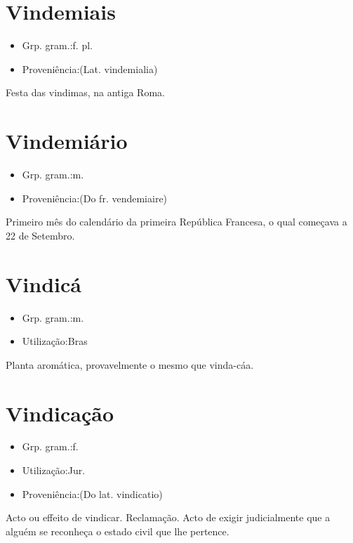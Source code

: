 \documentclass{article}
\begin{document}
\section{Vindemiais}
\begin{itemize}
\item {Grp. gram.:f. pl.}
\end{itemize}
\begin{itemize}
\item {Proveniência:(Lat. \textunderscore vindemialia\textunderscore )}
\end{itemize}
Festa das vindimas, na antiga Roma.
\section{Vindemiário}
\begin{itemize}
\item {Grp. gram.:m.}
\end{itemize}
\begin{itemize}
\item {Proveniência:(Do fr. \textunderscore vendemiaire\textunderscore )}
\end{itemize}
Primeiro mês do calendário da primeira República Francesa, o qual começava a 22 de Setembro.
\section{Vindicá}
\begin{itemize}
\item {Grp. gram.:m.}
\end{itemize}
\begin{itemize}
\item {Utilização:Bras}
\end{itemize}
Planta aromática, provavelmente o mesmo que \textunderscore vinda-cáa\textunderscore .
\section{Vindicação}
\begin{itemize}
\item {Grp. gram.:f.}
\end{itemize}
\begin{itemize}
\item {Utilização:Jur.}
\end{itemize}
\begin{itemize}
\item {Proveniência:(Do lat. \textunderscore vindicatio\textunderscore )}
\end{itemize}
Acto ou effeito de vindicar.
Reclamação.
Acto de exigir judicialmente que a alguém se reconheça o estado civil que lhe pertence.
\end{document}
